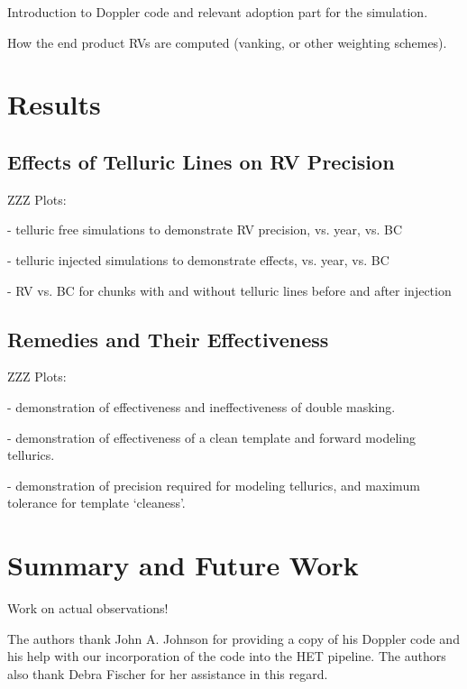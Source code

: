 \documentclass{emulateapj}
\begin{document}
\begin{CJK*}{UTF8}{gbsn}
Introduction to Doppler code and relevant adoption part for the
simulation.

How the end product RVs are computed (vanking, or other weighting schemes).


\section{Results}


\subsection{Effects of Telluric Lines on RV Precision}

ZZZ Plots:

- telluric free simulations to demonstrate RV precision, vs. year,
vs. BC

- telluric injected simulations to demonstrate effects, vs. year, vs. BC

- RV vs. BC for chunks with and without telluric lines before and
after injection

\subsection{Remedies and Their Effectiveness}

ZZZ Plots:

- demonstration of effectiveness and ineffectiveness of double masking.

- demonstration of effectiveness of a clean template and forward
modeling tellurics.

- demonstration of precision required for modeling tellurics, and
maximum tolerance for template `cleaness'. 


\section{Summary and Future Work}\label{sec:summary}

Work on actual observations!


\acknowledgements
The authors thank John A. Johnson for providing a copy of his Doppler
code and his help with our incorporation of the code into the HET
pipeline.  The authors also thank Debra Fischer for her assistance in
this regard.


\end{CJK*}
\end{document}
